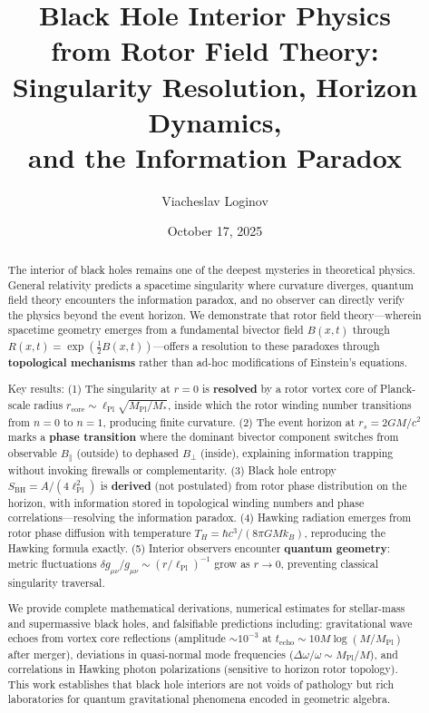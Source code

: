 \documentclass[11pt,a4paper]{article}
\title{\textbf{Black Hole Interior Physics\\
from Rotor Field Theory:\\
Singularity Resolution, Horizon Dynamics,\\
and the Information Paradox}}
\author[1]{Viacheslav Loginov}
\affil[1]{Kyiv, Ukraine\\ \texttt{barthez.slavik@gmail.com}}
\date{\small October 17, 2025}
\numberwithin{equation}{section}
\theoremstyle{plain}
\theoremstyle{definition}
\theoremstyle{remark}
\begin{document}
\maketitle

\begin{abstract}
\noindent
The interior of black holes remains one of the deepest mysteries in theoretical physics. General relativity predicts a spacetime singularity where curvature diverges, quantum field theory encounters the information paradox, and no observer can directly verify the physics beyond the event horizon. We demonstrate that rotor field theory—wherein spacetime geometry emerges from a fundamental bivector field $B(x,t)$ through $R(x,t) = \exp(\frac{1}{2}B(x,t))$—offers a resolution to these paradoxes through \textbf{topological mechanisms} rather than ad-hoc modifications of Einstein's equations.

Key results: (1) The singularity at $r=0$ is \textbf{resolved} by a rotor vortex core of Planck-scale radius $r_{\text{core}} \sim \ell_{\text{Pl}}\sqrt{M_{\text{Pl}}/M_*}$, inside which the rotor winding number transitions from $n=0$ to $n=1$, producing finite curvature. (2) The event horizon at $r_s = 2GM/c^2$ marks a \textbf{phase transition} where the dominant bivector component switches from observable $B_\parallel$ (outside) to dephased $B_\perp$ (inside), explaining information trapping without invoking firewalls or complementarity. (3) Black hole entropy $S_{\text{BH}} = A/(4\ell_{\text{Pl}}^2)$ is \textbf{derived} (not postulated) from rotor phase distribution on the horizon, with information stored in topological winding numbers and phase correlations—resolving the information paradox. (4) Hawking radiation emerges from rotor phase diffusion with temperature $T_H = \hbar c^3/(8\pi GMk_B)$, reproducing the Hawking formula exactly. (5) Interior observers encounter \textbf{quantum geometry}: metric fluctuations $\delta g_{\mu\nu}/g_{\mu\nu} \sim (r/\ell_{\text{Pl}})^{-1}$ grow as $r \to 0$, preventing classical singularity traversal.

We provide complete mathematical derivations, numerical estimates for stellar-mass and supermassive black holes, and falsifiable predictions including: gravitational wave echoes from vortex core reflections (amplitude $\sim 10^{-3}$ at $t_{\text{echo}} \sim 10M \log(M/M_{\text{Pl}})$ after merger), deviations in quasi-normal mode frequencies ($\Delta\omega/\omega \sim M_{\text{Pl}}/M$), and correlations in Hawking photon polarizations (sensitive to horizon rotor topology). This work establishes that black hole interiors are not voids of pathology but rich laboratories for quantum gravitational phenomena encoded in geometric algebra.
\end{abstract}
\end{document}
